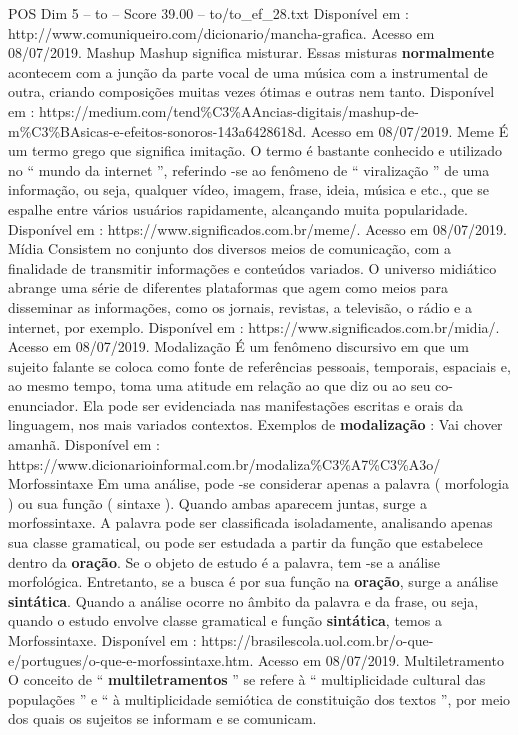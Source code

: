 \begin{textsample}{POS Dim 5 – to – Score 39.00 – to/to\_ef\_28.txt}
Disponível em : http://www.comuniqueiro.com/dicionario/mancha-grafica.
Acesso em 08/07/2019.
Mashup Mashup significa misturar.
Essas misturas \textbf{normalmente} acontecem com a junção da parte vocal de uma música com a instrumental de outra, criando composições muitas vezes ótimas e outras nem tanto.
Disponível em : https://medium.com/tend\%C3\%AAncias-digitais/mashup-de-m\%C3\%BAsicas-e-efeitos-sonoros-143a6428618d.
Acesso em 08/07/2019.
Meme É um termo grego que significa imitação.
O termo é bastante conhecido e utilizado no “ mundo da internet ”, referindo -se ao fenômeno de “ viralização ” de uma informação, ou seja, qualquer vídeo, imagem, frase, ideia, música e etc., que se espalhe entre vários usuários rapidamente, alcançando muita popularidade.
Disponível em : https://www.significados.com.br/meme/.
Acesso em 08/07/2019.
Mídia Consistem no conjunto dos diversos meios de comunicação, com a finalidade de transmitir informações e conteúdos variados.
O universo midiático abrange uma série de diferentes plataformas que agem como meios para disseminar as informações, como os jornais, revistas, a televisão, o rádio e a internet, por exemplo.
Disponível em : https://www.significados.com.br/midia/.
Acesso em 08/07/2019.
Modalização É um fenômeno discursivo em que um sujeito falante se coloca como fonte de referências pessoais, temporais, espaciais e, ao mesmo tempo, toma uma atitude em relação ao que diz ou ao seu co-enunciador.
Ela pode ser evidenciada nas manifestações escritas e orais da linguagem, nos mais variados contextos.
Exemplos de \textbf{modalização} : Vai chover amanhã.
Disponível em : https://www.dicionarioinformal.com.br/modaliza\%C3\%A7\%C3\%A3o/ Morfossintaxe Em uma análise, pode -se considerar apenas a palavra ( morfologia ) ou sua função ( sintaxe ).
Quando ambas aparecem juntas, surge a morfossintaxe.
A palavra pode ser classificada isoladamente, analisando apenas sua classe gramatical, ou pode ser estudada a partir da função que estabelece dentro da \textbf{oração}.
Se o objeto de estudo é a palavra, tem -se a análise morfológica.
Entretanto, se a busca é por sua função na \textbf{oração}, surge a análise \textbf{sintática}.
Quando a análise ocorre no âmbito da palavra e da frase, ou seja, quando o estudo envolve classe gramatical e função \textbf{sintática}, temos a Morfossintaxe.
Disponível em : https://brasilescola.uol.com.br/o-que-e/portugues/o-que-e-morfossintaxe.htm.
Acesso em 08/07/2019.
Multiletramento O conceito de “ \textbf{multiletramentos} ” se refere à “ multiplicidade cultural das populações ” e “ à multiplicidade semiótica de constituição dos textos ”, por meio dos quais os sujeitos se informam e se comunicam.

\end{textsample}
